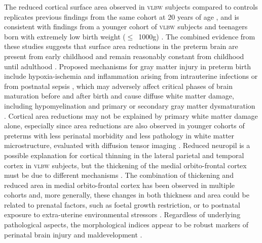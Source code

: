 The reduced cortical surface area observed in \textsc{vlbw} subjects compared to controls replicates previous findings from the same cohort at 20 years of age \citep{Skranes2013}, and is consistent with findings from a younger cohort of \textsc{vlbw} subjects \citep{Solsnes2015} and teenagers born with extremely low birth weight ($\leqslant$~1000g) \citep{Grunewaldt2014}. The combined evidence from these studies suggests that surface area reductions in the preterm brain are present from early childhood and remain reasonably constant from childhood until adulthood \citep{Rimol2016}. Proposed mechanisms for gray matter injury in preterm birth include hypoxia-ischemia and inflammation arising from intrauterine infections or from postnatal sepsis \citep{Volpe2009, Volpe2011}, which may adversely affect critical phases of brain maturation before and after birth and cause diffuse white matter damage, including hypomyelination and primary or secondary gray matter dysmaturation \citep{Hagberg2015}. Cortical area reductions may not be explained by primary white matter damage alone, especially since area reductions are also observed in younger cohorts of preterms with less perinatal morbidity and less pathology in white matter microstructure, evaluated with diffusion tensor imaging \citep{Eikenes2011,Rimol2016}. Reduced neuropil is a possible explanation for cortical thinning in the lateral parietal and temporal cortex in \textsc{vlbw} subjects, but the thickening of the medial orbito-frontal cortex must be due to different mechanisms \citep{Marin-Padilla1997, Bjuland2013, Grunewaldt2014}. The combination of thickening and reduced area in medial orbito-frontal cortex has been observed in multiple cohorts and, more generally, these changes in both thickness and area could be related to prenatal factors, such as foetal growth restriction, or to postnatal exposure to extra-uterine environmental stressors \citep{Solsnes2015, Rimol2016}. Regardless of underlying pathological aspects, the morphological indices appear to be robust markers of perinatal brain injury and maldevelopment \citep{Raznahan2011, Skranes2013, Rimol2016}.

